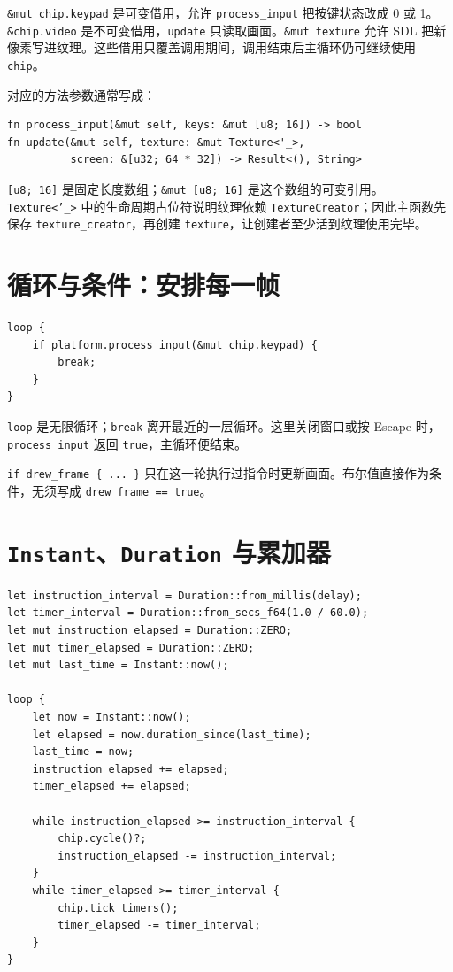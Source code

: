 \documentclass[UTF8,11pt,a4paper]{ctexart}
\begin{document}
\texttt{\&mut chip.keypad} 是可变借用，允许 \texttt{process\_input} 把按键状态改成 0 或 1。\texttt{\&chip.video} 是不可变借用，\texttt{update} 只读取画面。\texttt{\&mut texture} 允许 SDL 把新像素写进纹理。这些借用只覆盖调用期间，调用结束后主循环仍可继续使用 \texttt{chip}。

对应的方法参数通常写成：

\begin{lstlisting}
fn process_input(&mut self, keys: &mut [u8; 16]) -> bool
fn update(&mut self, texture: &mut Texture<'_>,
          screen: &[u32; 64 * 32]) -> Result<(), String>
\end{lstlisting}

\texttt{[u8; 16]} 是固定长度数组；\texttt{\&mut [u8; 16]} 是这个数组的可变引用。\texttt{Texture<'\_>} 中的生命周期占位符说明纹理依赖 \texttt{TextureCreator}；因此主函数先保存 \texttt{texture\_creator}，再创建 \texttt{texture}，让创建者至少活到纹理使用完毕。

\section{循环与条件：安排每一帧}

\begin{lstlisting}
loop {
    if platform.process_input(&mut chip.keypad) {
        break;
    }
}
\end{lstlisting}

\texttt{loop} 是无限循环；\texttt{break} 离开最近的一层循环。这里关闭窗口或按 Escape 时，\texttt{process\_input} 返回 \texttt{true}，主循环便结束。

\texttt{if drew\_frame \{ ... \}} 只在这一轮执行过指令时更新画面。布尔值直接作为条件，无须写成 \texttt{drew\_frame == true}。

\section{\texttt{Instant}、\texttt{Duration} 与累加器}

\begin{lstlisting}
let instruction_interval = Duration::from_millis(delay);
let timer_interval = Duration::from_secs_f64(1.0 / 60.0);
let mut instruction_elapsed = Duration::ZERO;
let mut timer_elapsed = Duration::ZERO;
let mut last_time = Instant::now();

loop {
    let now = Instant::now();
    let elapsed = now.duration_since(last_time);
    last_time = now;
    instruction_elapsed += elapsed;
    timer_elapsed += elapsed;

    while instruction_elapsed >= instruction_interval {
        chip.cycle()?;
        instruction_elapsed -= instruction_interval;
    }
    while timer_elapsed >= timer_interval {
        chip.tick_timers();
        timer_elapsed -= timer_interval;
    }
}
\end{lstlisting}
\end{document}
